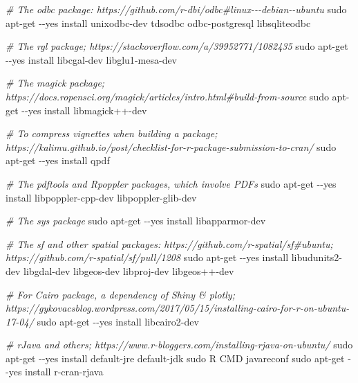 \documentclass[
]{book}
\newenvironment{Shaded}{\begin{snugshade}}{\end{snugshade}}
\newcommand{\CommentTok}[1]{\textcolor[rgb]{0.56,0.35,0.01}{\textit{#1}}}
\newcommand{\FunctionTok}[1]{\textcolor[rgb]{0.00,0.00,0.00}{#1}}
\newcommand{\NormalTok}[1]{#1}
\newcommand{\StringTok}[1]{\textcolor[rgb]{0.31,0.60,0.02}{#1}}
\begin{document}
\begin{Shaded}
\begin{Highlighting}[]
  \CommentTok{\# The \textquotesingle{}odbc\textquotesingle{} package: https://github.com/r{-}dbi/odbc\#linux{-}{-}{-}debian{-}{-}ubuntu}
  \FunctionTok{sudo}\NormalTok{ apt{-}get {-}{-}yes install unixodbc{-}dev tdsodbc odbc{-}postgresql libsqliteodbc}

  \CommentTok{\# The \textquotesingle{}rgl\textquotesingle{} package; https://stackoverflow.com/a/39952771/1082435}
  \FunctionTok{sudo}\NormalTok{ apt{-}get {-}{-}yes install libcgal{-}dev libglu1{-}mesa{-}dev}

  \CommentTok{\# The \textquotesingle{}magick\textquotesingle{} package; https://docs.ropensci.org/magick/articles/intro.html\#build{-}from{-}source}
  \FunctionTok{sudo}\NormalTok{ apt{-}get {-}{-}yes install }\StringTok{\textquotesingle{}libmagick++{-}dev\textquotesingle{}}

  \CommentTok{\# To compress vignettes when building a package; https://kalimu.github.io/post/checklist{-}for{-}r{-}package{-}submission{-}to{-}cran/}
  \FunctionTok{sudo}\NormalTok{ apt{-}get {-}{-}yes install qpdf}

  \CommentTok{\# The \textquotesingle{}pdftools\textquotesingle{} and \textquotesingle{}Rpoppler\textquotesingle{} packages, which involve PDFs}
  \FunctionTok{sudo}\NormalTok{ apt{-}get {-}{-}yes install libpoppler{-}cpp{-}dev libpoppler{-}glib{-}dev}

  \CommentTok{\# The \textquotesingle{}sys\textquotesingle{} package}
  \FunctionTok{sudo}\NormalTok{ apt{-}get {-}{-}yes install libapparmor{-}dev}

  \CommentTok{\# The \textquotesingle{}sf\textquotesingle{} and other spatial packages: https://github.com/r{-}spatial/sf\#ubuntu; https://github.com/r{-}spatial/sf/pull/1208}
  \FunctionTok{sudo}\NormalTok{ apt{-}get {-}{-}yes install libudunits2{-}dev libgdal{-}dev libgeos{-}dev libproj{-}dev libgeos++{-}dev}

  \CommentTok{\# For Cairo package, a dependency of Shiny \& plotly; https://gykovacsblog.wordpress.com/2017/05/15/installing{-}cairo{-}for{-}r{-}on{-}ubuntu{-}17{-}04/}
  \FunctionTok{sudo}\NormalTok{ apt{-}get {-}{-}yes install libcairo2{-}dev}

  \CommentTok{\# \textquotesingle{}rJava\textquotesingle{} and others; https://www.r{-}bloggers.com/installing{-}rjava{-}on{-}ubuntu/}
  \FunctionTok{sudo}\NormalTok{ apt{-}get {-}{-}yes install default{-}jre default{-}jdk}
  \FunctionTok{sudo}\NormalTok{ R CMD javareconf}
  \FunctionTok{sudo}\NormalTok{ apt{-}get {-}{-}yes install r{-}cran{-}rjava}


\end{Highlighting}
\end{Shaded}
\end{document}
